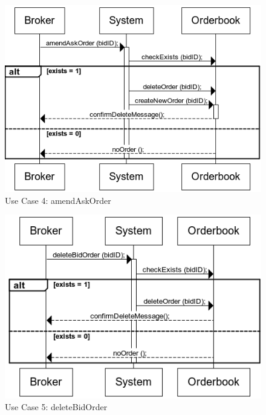 \documentclass[a4paper]{article}
\begin{document}
\newpage

\begin{figure}[h]
  \caption{Use Case 4: amendAskOrder}
  \centering
    \includegraphics[width=1\textwidth]{images/amendAskOrder}
\end{figure}

\begin{figure}
  \caption{Use Case 5: deleteBidOrder}
  \centering
    \includegraphics[width=1\textwidth]{images/deleteBidOrder}
\end{figure}
\end{document}
